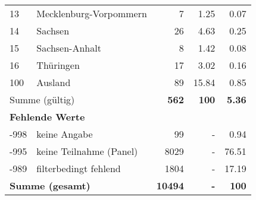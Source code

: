 \begin{longtable}{lXrrr}
     13 &
     \multicolumn{1}{X}{ Mecklenburg-Vorpommern   } &


       \num{7} &
       \num[round-mode=places,round-precision=2]{1.25} &
         \num[round-mode=places,round-precision=2]{0.07} \\

     14 &
     \multicolumn{1}{X}{ Sachsen   } &


       \num{26} &
       \num[round-mode=places,round-precision=2]{4.63} &
         \num[round-mode=places,round-precision=2]{0.25} \\

     15 &
     \multicolumn{1}{X}{ Sachsen-Anhalt   } &


       \num{8} &
       \num[round-mode=places,round-precision=2]{1.42} &
         \num[round-mode=places,round-precision=2]{0.08} \\

     16 &
     \multicolumn{1}{X}{ Thüringen   } &


       \num{17} &
       \num[round-mode=places,round-precision=2]{3.02} &
         \num[round-mode=places,round-precision=2]{0.16} \\

     100 &
     \multicolumn{1}{X}{ Ausland   } &


       \num{89} &
       \num[round-mode=places,round-precision=2]{15.84} &
         \num[round-mode=places,round-precision=2]{0.85} \\
     \midrule
     \multicolumn{2}{l}{Summe (gültig)} &
       \textbf{\num{562}} &
     \textbf{\num{100}} &
       \textbf{\num[round-mode=places,round-precision=2]{5.36}} \\
     \multicolumn{5}{l}{\textbf{Fehlende Werte}}\\
       -998 &
       keine Angabe &
         \num{99} &
        - &
         \num[round-mode=places,round-precision=2]{0.94} \\
       -995 &
       keine Teilnahme (Panel) &
         \num{8029} &
        - &
         \num[round-mode=places,round-precision=2]{76.51} \\
       -989 &
       filterbedingt fehlend &
         \num{1804} &
        - &
         \num[round-mode=places,round-precision=2]{17.19} \\
     \midrule
     \multicolumn{2}{l}{\textbf{Summe (gesamt)}} &
          \textbf{\num{10494}} &
        \textbf{-} &
        \textbf{\num{100}} \\
     \bottomrule
     \end{longtable}
     
